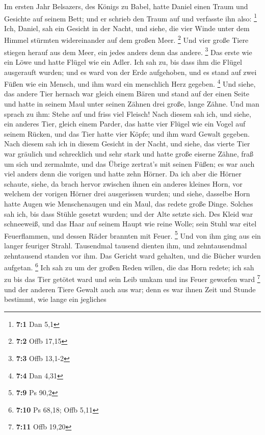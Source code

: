  Im ersten Jahr Belsazers, des Königs zu Babel, hatte Daniel
einen Traum und Gesichte auf seinem Bett; und er schrieb den Traum auf
und verfasste ihn also: \footnote{\textbf{7:1} Dan 5,1} 
Ich, Daniel, sah ein Gesicht in der Nacht, und siehe, die vier Winde
unter dem Himmel stürmten widereinander auf dem großen Meer. \footnote{\textbf{7:2}
  Offb 17,15}  Und vier große Tiere stiegen herauf aus dem
Meer, ein jedes anders denn das andere. \footnote{\textbf{7:3} Offb
  13,1-2}  Das erste wie ein Löwe und hatte Flügel wie ein
Adler. Ich sah zu, bis dass ihm die Flügel ausgerauft wurden; und es
ward von der Erde aufgehoben, und es stand auf zwei Füßen wie ein
Mensch, und ihm ward ein menschlich Herz gegeben. \footnote{\textbf{7:4}
  Dan 4,31}  Und siehe, das andere Tier hernach war gleich
einem Bären und stand auf der einen Seite und hatte in seinem Maul unter
seinen Zähnen drei große, lange Zähne. Und man sprach zu ihm: Stehe auf
und friss viel Fleisch!  Nach diesem sah ich, und siehe, ein
anderes Tier, gleich einem Parder, das hatte vier Flügel wie ein Vogel
auf seinem Rücken, und das Tier hatte vier Köpfe; und ihm ward Gewalt
gegeben.  Nach diesem sah ich in diesem Gesicht in der
Nacht, und siehe, das vierte Tier war gräulich und schrecklich und sehr
stark und hatte große eiserne Zähne, fraß um sich und zermalmte, und das
Übrige zertrat's mit seinen Füßen; es war auch viel anders denn die
vorigen und hatte zehn Hörner.  Da ich aber die Hörner
schaute, siehe, da brach hervor zwischen ihnen ein anderes kleines Horn,
vor welchem der vorigen Hörner drei ausgerissen wurden; und siehe,
dasselbe Horn hatte Augen wie Menschenaugen und ein Maul, das redete
große Dinge.  Solches sah ich, bis dass Stühle gesetzt
wurden; und der Alte setzte sich. Des Kleid war schneeweiß, und das Haar
auf seinem Haupt wie reine Wolle; sein Stuhl war eitel Feuerflammen, und
dessen Räder brannten mit Feuer. \footnote{\textbf{7:9} Ps 90,2}
 Und von ihm ging aus ein langer feuriger Strahl.
Tausendmal tausend dienten ihm, und zehntausendmal zehntausend standen
vor ihm. Das Gericht ward gehalten, und die Bücher wurden aufgetan.
\footnote{\textbf{7:10} Ps 68,18; Offb 5,11}  Ich sah zu um
der großen Reden willen, die das Horn redete; ich sah zu bis das Tier
getötet ward und sein Leib umkam und ins Feuer geworfen ward \footnote{\textbf{7:11}
  Offb 19,20}  und der anderen Tiere Gewalt auch aus war;
denn es war ihnen Zeit und Stunde bestimmt, wie lange ein jegliches
